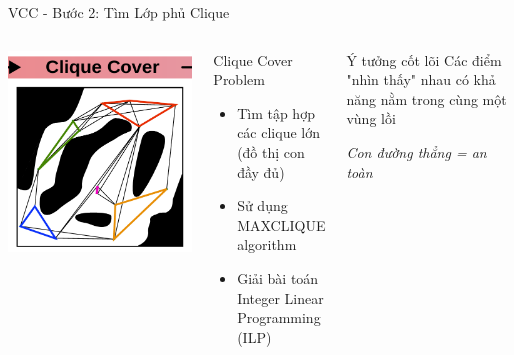 \documentclass[aspectratio=169]{beamer}
\begin{document}
\begin{frame}{VCC - Bước 2: Tìm Lớp phủ Clique}
    \begin{columns}[c]
        \centering
        \includegraphics[width=\textwidth]{imgs/VCC-2.png}

        \begin{block}{Clique Cover Problem}
            \small
            \begin{itemize}
                \item Tìm tập hợp các clique lớn (đồ thị con đầy đủ)
                \item Sử dụng MAXCLIQUE algorithm
                \item Giải bài toán Integer Linear Programming (ILP)
            \end{itemize}
        \end{block}

        \begin{exampleblock}{Ý tưởng cốt lõi}
            \small
            Các điểm "nhìn thấy" nhau có khả năng nằm trong cùng một vùng lồi
            
            \vspace{0.2cm}
            \textit{Con đường thẳng = an toàn}
        \end{exampleblock}
    \end{columns}
\end{frame}
\end{document}
